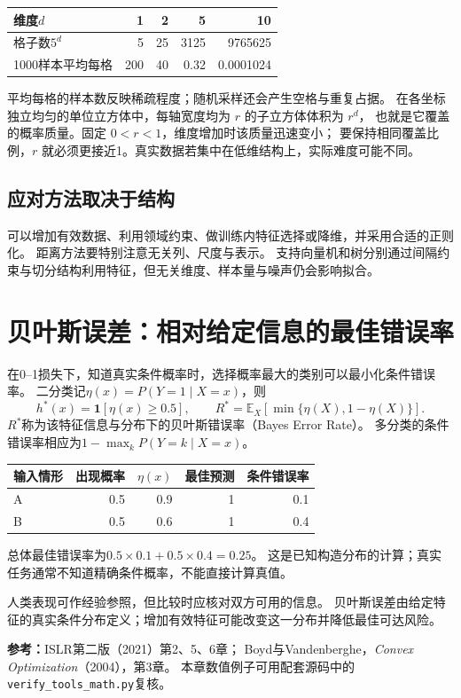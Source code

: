 \begin{center}
\begin{tabular}{lrrrr}
\toprule
维度$d$ & 1 & 2 & 5 & 10\\
\midrule
格子数$5^d$ & 5 & 25 & 3125 & 9765625\\
1000样本平均每格 & 200 & 40 & 0.32 & 0.0001024\\
\bottomrule
\end{tabular}
\end{center}

平均每格的样本数反映稀疏程度；随机采样还会产生空格与重复占据。
在各坐标独立均匀的单位立方体中，每轴宽度均为 $r$ 的子立方体体积为 $r^d$，
也就是它覆盖的概率质量。固定 $0<r<1$，维度增加时该质量迅速变小；
要保持相同覆盖比例，$r$ 就必须更接近1。真实数据若集中在低维结构上，实际难度可能不同。

\subsection{应对方法取决于结构}
可以增加有效数据、利用领域约束、做训练内特征选择或降维，并采用合适的正则化。
距离方法要特别注意无关列、尺度与表示。
支持向量机和树分别通过间隔约束与切分结构利用特征，但无关维度、样本量与噪声仍会影响拟合。


\section{贝叶斯误差：相对给定信息的最佳错误率}
\label{sec:tools-bayes-error}
在0--1损失下，知道真实条件概率时，选择概率最大的类别可以最小化条件错误率。
二分类记$\eta(x)=P(Y=1\mid X=x)$，则
\[
 h^*(x)=\mathbf1[\eta(x)\geq0.5],\qquad
 R^*=\mathbb E_X[\min\{\eta(X),1-\eta(X)\}].
\]
$R^*$称为该特征信息与分布下的贝叶斯错误率（Bayes Error Rate）。
多分类的条件错误率相应为$1-\max_k P(Y=k\mid X=x)$。

\begin{center}
\begin{tabular}{lrrrr}
\toprule
输入情形 & 出现概率 & $\eta(x)$ & 最佳预测 & 条件错误率\\
\midrule
A & 0.5 & 0.9 & 1 & 0.1\\
B & 0.5 & 0.6 & 1 & 0.4\\
\bottomrule
\end{tabular}
\end{center}
总体最佳错误率为$0.5\times0.1+0.5\times0.4=0.25$。
这是已知构造分布的计算；真实任务通常不知道精确条件概率，不能直接计算真值。

人类表现可作经验参照，但比较时应核对双方可用的信息。
贝叶斯误差由给定特征的真实条件分布定义；增加有效特征可能改变这一分布并降低最佳可达风险。

\begingroup\small
\noindent\textbf{参考：}ISLR第二版（2021）第2、5、6章；
Boyd与Vandenberghe，\textit{Convex Optimization}（2004），第3章。
本章数值例子可用配套源码中的\texttt{verify\_tools\_math.py}复核。
\par\endgroup

